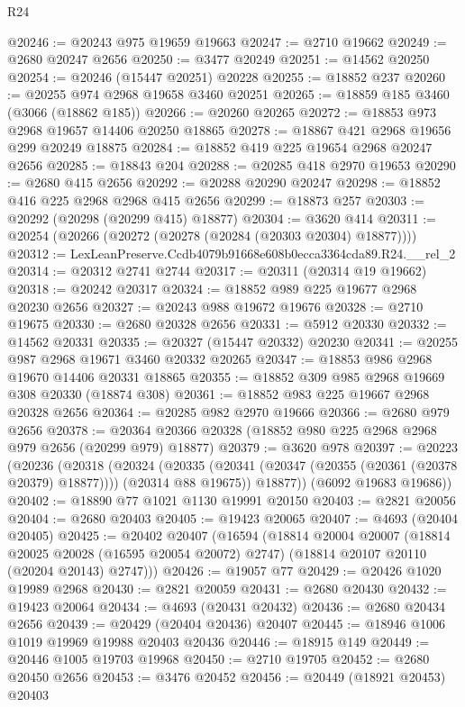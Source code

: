 \begin{lexlean}{R24}
\begin{coremodule}
@20246 := @20243 @975 @19659 @19663
@20247 := @2710 @19662
@20249 := @2680 @20247 @2656
@20250 := @3477 @20249
@20251 := @14562 @20250
@20254 := @20246 (@15447 @20251) @20228
@20255 := @18852 @237
@20260 := @20255 @974 @2968 @19658 @3460 @20251
@20265 := @18859 @185 @3460 (@3066 (@18862 @185))
@20266 := @20260 @20265
@20272 := @18853 @973 @2968 @19657 @14406 @20250 @18865
@20278 := @18867 @421 @2968 @19656 @299 @20249 @18875
@20284 := @18852 @419 @225 @19654 @2968 @20247 @2656
@20285 := @18843 @204
@20288 := @20285 @418 @2970 @19653
@20290 := @2680 @415 @2656
@20292 := @20288 @20290 @20247
@20298 := @18852 @416 @225 @2968 @2968 @415 @2656
@20299 := @18873 @257
@20303 := @20292 (@20298 (@20299 @415) @18877)
@20304 := @3620 @414
@20311 := @20254 (@20266 (@20272 (@20278 (@20284 (@20303 @20304) @18877))))
@20312 := LexLeanPreserve.Ccdb4079b91668e608b0ecca3364cda89.R24.__rel_2
@20314 := @20312 @2741 @2744
@20317 := @20311 (@20314 @19 @19662)
@20318 := @20242 @20317
@20324 := @18852 @989 @225 @19677 @2968 @20230 @2656
@20327 := @20243 @988 @19672 @19676
@20328 := @2710 @19675
@20330 := @2680 @20328 @2656
@20331 := @5912 @20330
@20332 := @14562 @20331
@20335 := @20327 (@15447 @20332) @20230
@20341 := @20255 @987 @2968 @19671 @3460 @20332 @20265
@20347 := @18853 @986 @2968 @19670 @14406 @20331 @18865
@20355 := @18852 @309 @985 @2968 @19669 @308 @20330 (@18874 @308)
@20361 := @18852 @983 @225 @19667 @2968 @20328 @2656
@20364 := @20285 @982 @2970 @19666
@20366 := @2680 @979 @2656
@20378 := @20364 @20366 @20328 (@18852 @980 @225 @2968 @2968 @979 @2656 (@20299 @979) @18877)
@20379 := @3620 @978
@20397 := @20223
    (@20236
      (@20318
        (@20324
          (@20335 (@20341 (@20347 (@20355 (@20361 (@20378 @20379) @18877)))) (@20314 @88 @19675))
          @18877))
      (@6092 @19683 @19686))
@20402 := @18890 @77 @1021 @1130 @19991 @20150
@20403 := @2821 @20056
@20404 := @2680 @20403
@20405 := @19423 @20065
@20407 := @4693 (@20404 @20405)
@20425 := @20402
    @20407
    (@16594
      (@18814
        @20004
        @20007
        (@18814 @20025 @20028 (@16595 @20054 @20072) @2747)
        (@18814 @20107 @20110 (@20204 @20143) @2747)))
@20426 := @19057 @77
@20429 := @20426 @1020 @19989 @2968
@20430 := @2821 @20059
@20431 := @2680 @20430
@20432 := @19423 @20064
@20434 := @4693 (@20431 @20432)
@20436 := @2680 @20434 @2656
@20439 := @20429 (@20404 @20436) @20407
@20445 := @18946 @1006 @1019 @19969 @19988 @20403 @20436
@20446 := @18915 @149
@20449 := @20446 @1005 @19703 @19968
@20450 := @2710 @19705
@20452 := @2680 @20450 @2656
@20453 := @3476 @20452
@20456 := @20449 (@18921 @20453) @20403

\end{coremodule}
\end{lexlean}
